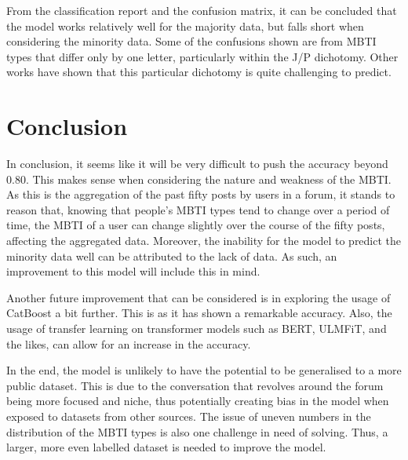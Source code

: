 \documentclass[11pt,a4paper]{article}
\begin{document}
	From the classification report and the confusion matrix, it can be concluded that the model works relatively well for the majority data, but falls short when considering the minority data. Some of the confusions shown are from MBTI types that differ only by one letter, particularly within the J/P dichotomy.\autocite{choongPredictingJudgingperceivingMyersBriggs2021} Other works have shown that this particular dichotomy is quite challenging to predict.
	
	\newpage
	\section{Conclusion}
	
	In conclusion, it seems like it will be very difficult to push the accuracy beyond 0.80. This makes sense when considering the nature and weakness of the MBTI. As this is the aggregation of the past fifty posts by users in a forum, it stands to reason that, knowing that people's MBTI types tend to change over a period of time, the MBTI of a user can change slightly over the course of the fifty posts, affecting the aggregated data. Moreover, the inability for the model to predict the minority data well can be attributed to the lack of data. As such, an improvement to this model will include this in mind.
	
	Another future improvement that can be considered is in exploring the usage of CatBoost a bit further. This is as it has shown a remarkable accuracy. Also, the usage of transfer learning on transformer models such as BERT, ULMFiT, and the likes, can allow for an increase in the accuracy.
	
	In the end, the model is unlikely to have the potential to be generalised to a more public dataset. This is due to the conversation that revolves around the forum being more focused and niche, thus potentially creating bias in the model when exposed to datasets from other sources.\autocite{choongPredictingJudgingperceivingMyersBriggs2021} The issue of uneven numbers in the distribution of the MBTI types is also one challenge in need of solving. Thus, a larger, more even labelled dataset is needed to improve the model.
	
	\newpage
	\printbibliography
\end{document}
